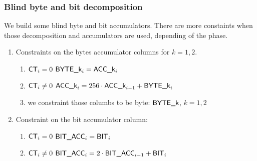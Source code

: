 \subsubsection{Blind byte and bit decomposition}
We build some blind byte and bit accumulators. There are more constaints when those decomposition and accumulators are used, depending of the phase. 
\begin{enumerate}
    \item Constraints on the bytes accumulator columns for $k = 1,2$. 
        \begin{enumerate}
            \item \If $\textsf{CT}_{i} = 0$ \Then $\textsf{BYTE}\textsf{\_k}_{i} = \textsf{ACC}\textsf{\_k}_{i}$
            \item \If $\textsf{CT}_{i} \ne 0$  \Then $\textsf{ACC}\textsf{\_k}_{i} = 256 \cdot \textsf{ACC}\textsf{\_k}_{i-1} + \textsf{BYTE}\textsf{\_k}_{i}$
            \item we constraint those columbs to be byte: $\textsf{BYTE}\textsf{\_k}$, $k = 1,2$
        \end{enumerate}
    \item Constraint on the bit accumulator column:
        \begin{enumerate}
            \item \If $\textsf{CT}_{i} = 0$ \Then $\textsf{BIT}\textsf{\_}\textsf{ACC}_{i} = \textsf{BIT}_{i}$
            \item \If $\textsf{CT}_{i} \ne 0$  \Then $\textsf{BIT}\textsf{\_}\textsf{ACC}_{i} = 2 \cdot \textsf{BIT}\textsf{\_}\textsf{ACC}_{i-1} + \textsf{BIT}_{i}$
        \end{enumerate}
\end{enumerate}

